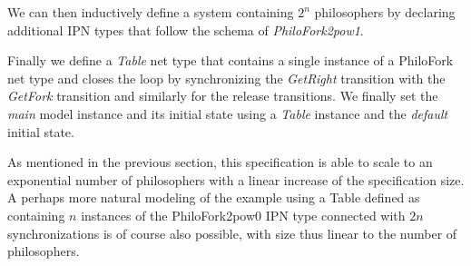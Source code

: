  We can then inductively define a system
containing $2^n$ philosophers by declaring additional IPN types that
follow the schema of \emph{PhiloFork2pow1}.

Finally we define a \emph{Table} net type that contains a single instance of
a PhiloFork net type and closes the loop by synchronizing the
\emph{GetRight} transition with the \emph{GetFork} transition and
similarly for the release transitions.  We finally set the \emph{main}
model instance and its initial state using a \emph{Table} instance and
the \emph{default} initial state.

As mentioned in the previous section, this specification is able to
scale to an exponential number of philosophers with a linear increase
of the specification size.  A perhaps more natural modeling of the
example using a Table defined as containing $n$ instances of the
PhiloFork2pow0 IPN type connected with $2 n$ synchronizations is of
course also possible, with size thus linear to the number of philosophers.
